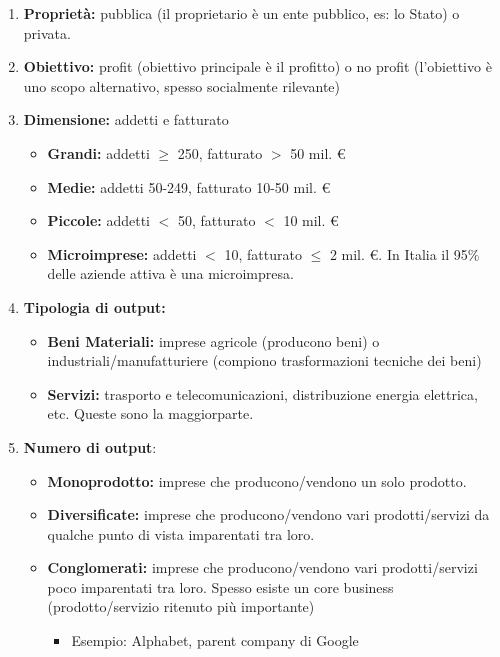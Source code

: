 \documentclass[../main.tex]{subfiles}
\begin{document}
\begin{enumerate}
\item \textbf{Proprietà:} pubblica (il proprietario è un ente pubblico, es: lo Stato) o privata.

\item \textbf{Obiettivo:} profit (obiettivo principale è il profitto) o no profit (l'obiettivo è uno scopo alternativo, spesso socialmente rilevante)

\item \textbf{Dimensione:} addetti e fatturato
	\begin{itemize}
	\item
	\textbf{Grandi:} addetti $\geq$ 250, fatturato $>$ 50 mil. \euro
	\item \textbf{Medie:} addetti 50-249, fatturato 10-50 mil. \euro
	\item \textbf{Piccole:} addetti $<$ 50, fatturato $<$ 10 mil. \euro
	\item \textbf{Microimprese:} addetti $<$ 10, fatturato $\leq$ 2 mil. \euro. In Italia il 95\% delle aziende attiva è una microimpresa.
	\end{itemize}

\item \textbf{Tipologia di output:}
	\begin{itemize}
	\item
	\textbf{Beni Materiali:} imprese agricole (producono beni) o industriali/manufatturiere (compiono trasformazioni tecniche dei beni)
	
	\item \textbf{Servizi:} trasporto e telecomunicazioni, distribuzione energia elettrica, etc. Queste sono la maggiorparte.
	\end{itemize}

\item \textbf{Numero di output}:
	\begin{itemize}
	\item \textbf{Monoprodotto:} imprese che producono/vendono un solo prodotto.
	\item  \textbf{Diversificate:} imprese che producono/vendono vari prodotti/servizi da qualche punto di vista imparentati tra loro.
	\item \textbf{Conglomerati:} imprese che producono/vendono vari prodotti/servizi poco imparentati tra loro. Spesso esiste un core business (prodotto/servizio ritenuto più importante)
		\begin{itemize}
		\item Esempio: Alphabet, parent company di Google
		\end{itemize}
	\end{itemize}


\end{enumerate}
\end{document}
